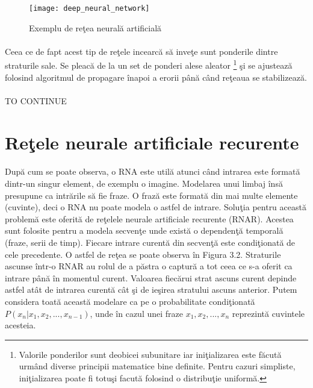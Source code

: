 \begin{figure}[H]
\centering
\texttt{[image: deep\_neural\_network]}
\caption{Exemplu de re\c tea neural\u a artificial\u a}
\end{figure}

\paragraph{}
Ceea ce de fapt acest tip de re\c tele incearc\u a s\u a inve\c te sunt ponderile dintre straturile sale. Se pleac\u a de la un set de ponderi alese aleator \footnote{Valorile ponderilor sunt deobicei subunitare iar ini\c tializarea este f\u acut\u a urm\^ and diverse principii matematice bine definite. Pentru cazuri simpliste, ini\c tializarea poate fi totu\c si facut\u a folosind o distribu\c tie uniform\u a.} \c si se ajusteaz\u a folosind algoritmul de propagare \^ inapoi a erorii p\^ an\u a c\^and re\c teaua se stabilizeaz\u a. 

\paragraph{}
TO CONTINUE

\section{Re\c tele neurale artificiale recurente}

\paragraph{}
Dup\u a cum se poate observa, o RNA este util\u a atunci c\^ and intrarea este format\u a dintr-un singur element, de exemplu o imagine. Modelarea unui limbaj \^ ins\u a presupune ca intr\u arile s\u a fie fraze. O fraz\u a este format\u a din mai multe elemente (cuvinte), deci o RNA nu poate modela o astfel de intrare. Solu\c tia pentru aceast\u a problem\u a este oferit\u a de re\c telele neurale artificiale recurente (RNAR). Acestea sunt folosite pentru a modela secven\c te unde exist\u a o dependen\c t\u a temporal\u a (fraze, serii de timp). Fiecare intrare curent\u a din secven\c t\u a este condi\c tionat\u a de cele precedente. O astfel de re\c tea se poate observa \^ in Figura 3.2. Straturile ascunse \^ intr-o RNAR au rolul de a p\u astra o captur\u a a tot ceea ce s-a oferit ca intrare p\^ an\u a \^ in momentul curent. Valoarea fiec\u arui strat ascuns curent depinde astfel at\^ at de intrarea curent\u a c\^ at \c si de ie\c sirea stratului ascuns anterior. Putem considera toat\u a aceast\u a modelare ca pe o probabilitate condi\c tionat\u a \( P(x_{n} | x_{1}, x_{2},..., x_{n-1}) \), unde \^ in cazul unei fraze \(x_{1}, x_{2},..., x_{n}\) reprezint\u a cuvintele acesteia. 

